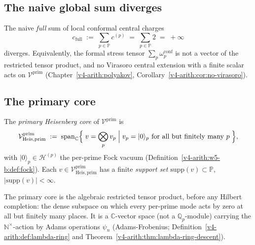 \subsection{The naive global sum diverges}
\label{v4-arith:w9-r3:full-divergent}

\begin{observation}
\label{v4-arith:w9-r3:obs:full-divergent}
The naive \emph{full} sum of local conformal
central charges
\begin{equation}
\label{v4-arith:w9-r3:eq:c-full-divergent}
c_{\mathrm{full}}\;:=\;\sum_{p\in\mathbb{P}}c^{(p)}\;=\;\sum_{p\in\mathbb{P}}2\;=\;+\infty
\end{equation}
diverges. Equivalently, the formal stress tensor
\(\sum_{p}\omega_{p}^{\mathrm{conf}}\) is not a vector of the
restricted tensor product, and no Virasoro central extension with a
finite scalar acts on \(\mathcal{V}^{\mathrm{prim}}\)
(Chapter~\ref{v4-arith:polyakov}, Corollary~\ref{v4-arith:cor:no-virasoro}).
\end{observation}

\subsection{The primary core}
\label{v4-arith:w9-r3:primary-core}

\begin{definition}
\label{v4-arith:w9-r3:def:primary-core}
The \emph{primary Heisenberg core} of
\(\mathcal{V}^{\mathrm{prim}}\) is
\begin{equation}
\label{v4-arith:w9-r3:eq:primary-core}
\mathcal{V}^{\mathrm{prim}}_{\mathrm{Heis},\mathrm{prim}}\;:=\;\mathrm{span}_{\mathbb{C}}\Bigl\{\;v=\bigotimes_{p}v_{p}\;\Big|\;v_{p}=|0\rangle_{p}\text{ for all but finitely many }p\;\Bigr\},
\end{equation}
with \(|0\rangle_{p}\in\mathcal{H}^{(p)}\) the per-prime Fock vacuum
(Definition~\ref{v4-arith:w5-b:def:fock}). Each \(v\in\mathcal{V}^{\mathrm{prim}}_{\mathrm{Heis},\mathrm{prim}}\)
has a finite \emph{support set} \(\mathrm{supp}(v)\subset\mathbb{P}\),
\(|\mathrm{supp}(v)|<\infty\).
\end{definition}

\begin{remark}[primary = finite-support]
\label{v4-arith:w9-r3:rem:primary-is-fin-supp}
The primary core is the algebraic restricted tensor product, before
any Hilbert completion: the dense subspace on which every
per-prime mode acts by zero at all but finitely many places. It is a
\(\mathbb{C}\)-vector space (not a \(\mathbb{Q}_{p}\)-module) carrying the
\(\mathbb{N}^{\times}\)-action by Adams operations
\(\psi_{n}\) (Adams-Frobenius; Definition~\ref{v4-arith:def:lambda-ring} and
Theorem~\ref{v4-arith:thm:lambda-ring-descent}).
\end{remark}

